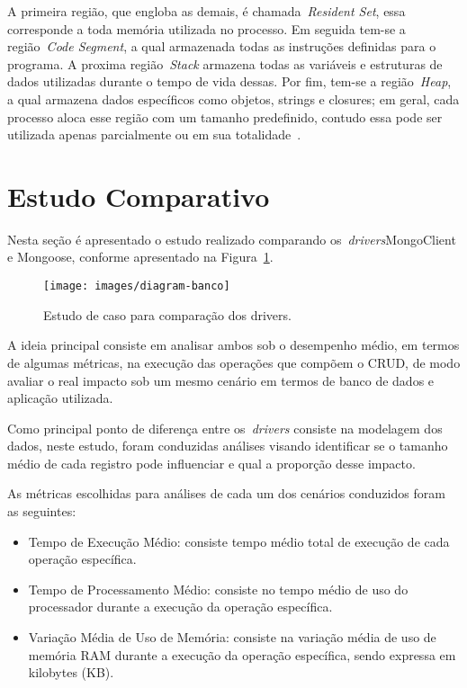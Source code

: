 \documentclass[12pt]{article}
\begin{document}
A primeira região, que engloba as demais, é chamada~\emph{Resident Set}, essa corresponde a toda memória utilizada no processo. 
Em seguida tem-se a região~\emph{Code Segment}, a qual armazenada todas as instruções definidas para o programa.
A proxima região~\emph{Stack} armazena todas as variáveis e estruturas de dados utilizadas durante o tempo de vida dessas.
Por fim, tem-se a região~\emph{Heap}, a qual armazena dados específicos como objetos, strings e closures; em geral, cada processo aloca esse região com um tamanho predefinido, contudo essa pode ser utilizada apenas parcialmente ou em sua totalidade~\cite{nodememory}. 

\section{Estudo Comparativo}
\label{section:estudo}

Nesta seção é apresentado o estudo realizado comparando os~\emph{drivers}MongoClient e Mongoose, conforme apresentado na Figura~\ref{figure:diagrama-banco}. 

\begin{figure}[ht]
    \centering
    \texttt{[image: images/diagram-banco]}
    \caption{Estudo de caso para comparação dos drivers.}
    \label{figure:diagrama-banco}
\end{figure}

A ideia principal consiste em analisar ambos sob o desempenho médio, em termos de algumas métricas, na execução das operações que compõem o CRUD, de modo avaliar o real impacto sob um mesmo cenário em termos de banco de dados e aplicação utilizada.

Como principal ponto de diferença entre os~\emph{drivers} consiste na modelagem dos dados, neste estudo, foram conduzidas análises visando identificar se o tamanho médio de cada registro pode influenciar e qual a proporção desse impacto.

As métricas escolhidas para análises de cada um dos cenários conduzidos foram as seguintes:
\begin{itemize}
\item Tempo de Execução Médio: consiste tempo médio total de execução de cada operação específica.
\item Tempo de Processamento Médio: consiste no tempo médio de uso do processador durante a execução da operação específica.
\item Variação Média de Uso de Memória: consiste na variação média de uso de memória RAM durante a execução da operação específica, sendo expressa em kilobytes (KB).
\end{itemize}
\end{document}
